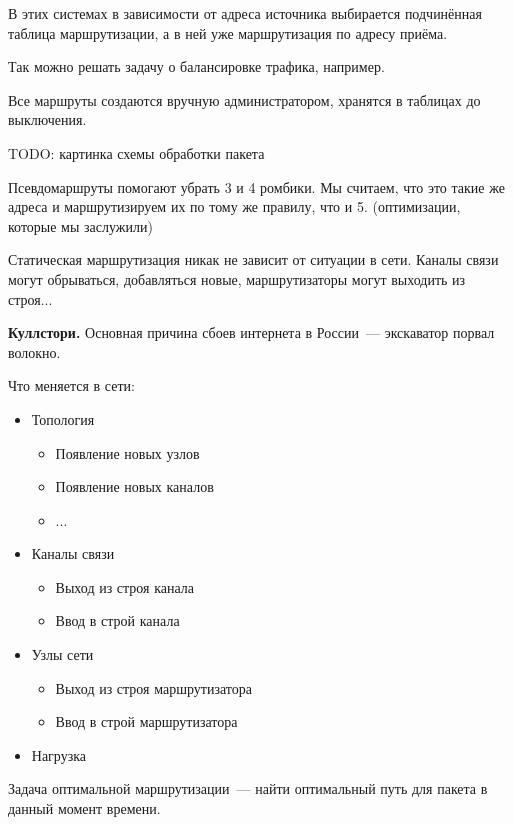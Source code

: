 В этих системах в зависимости от адреса источника выбирается подчинённая таблица маршрутизации, а в ней уже маршрутизация по адресу приёма.

Так можно решать задачу о балансировке трафика, например.


Все маршруты создаются вручную администратором, хранятся в таблицах до выключения.

TODO: картинка схемы обработки пакета

Псевдомаршруты помогают убрать 3 и 4 ромбики. Мы считаем, что это такие же адреса и маршрутизируем их по тому же правилу, что и 5. (оптимизации, которые мы заслужили)


Статическая маршрутизация никак не зависит от ситуации в сети. Каналы связи могут обрываться, добавляться новые, маршрутизаторы могут выходить из строя...

{\bf Куллстори.} Основная причина сбоев интернета в России~--- экскаватор порвал волокно.

Что меняется в сети:
\begin{itemize}
    \item Топология
    \begin{itemize}
        \item Появление новых узлов
        \item Появление новых каналов
        \item ...
    \end{itemize}
    \item Каналы связи
    \begin{itemize}
        \item Выход из строя канала
        \item Ввод в строй канала
    \end{itemize}
    \item Узлы сети
    \begin{itemize}
        \item Выход из строя маршрутизатора
        \item Ввод в строй маршрутизатора
    \end{itemize}
    \item Нагрузка
\end{itemize}


Задача оптимальной маршрутизации~--- найти оптимальный путь для пакета в данный момент времени.

